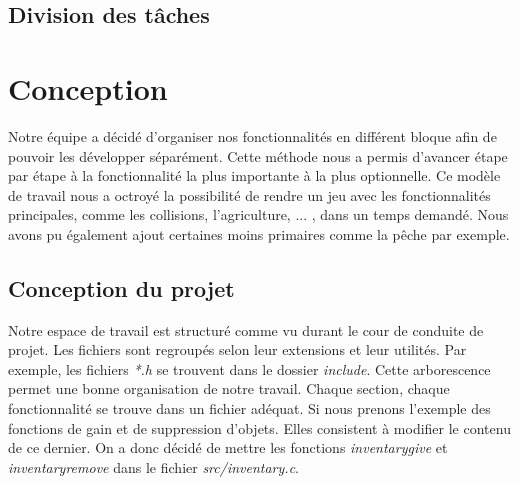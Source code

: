 \documentclass{article}
\begin{document}
\subsection{Division des tâches}
\section{Conception}
    Notre équipe a décidé d'organiser nos fonctionnalités en différent bloque afin de pouvoir les développer séparément. Cette méthode nous a permis d'avancer étape par étape à la fonctionnalité la plus importante à la plus optionnelle. Ce modèle de travail nous a octroyé la possibilité de rendre un jeu avec les fonctionnalités principales, comme les collisions, l'agriculture, ... , dans un temps demandé. Nous avons pu également ajout certaines moins primaires comme la pêche par exemple.
    
\subsection{Conception du projet}

 Notre espace de travail est structuré comme vu durant le cour de conduite de projet. Les fichiers sont regroupés selon leur extensions et leur utilités. Par exemple, les fichiers \textit{*.h} se trouvent dans le dossier \textit{include}. Cette arborescence permet une bonne organisation de notre travail. Chaque section, chaque fonctionnalité se trouve dans un fichier adéquat. Si nous prenons l'exemple des fonctions de gain et de suppression d'objets. Elles consistent à modifier le contenu de ce dernier. On a donc décidé de mettre les fonctions \textit{inventary\textunderscore give} et \textit{inventary\textunderscore remove} dans le fichier \textit{src/inventary.c}.
\end{document}
